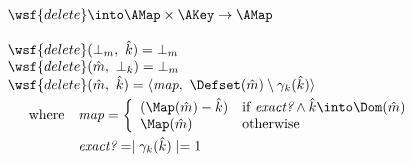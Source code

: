 $\begin{array}{l}
\wsf{delete} \into \AMap \times \AKey \rightarrow \AMap \\\\

\wsf{delete}(\bot_m,\ \hat{k}) = \bot_m \\
\wsf{delete}(\hat{m},\ \bot_k) = \bot_m \\

\wsf{delete}(\hat{m},\ \hat{k}) =
\langle \emph{map},\ \Defset(\hat{m}) \setminus \gamma_k(\hat{k}) \rangle \vspace{1mm}\\
\quad \begin{array}{rl} \textrm{where}
& \emph{map} = \left \{ \begin{array}{ll}
(\Map(\hat{m}) - \hat{k})
& \textrm{if } \emph{exact?} \land \hat{k} \into \Dom(\hat{m}) \\
\Map(\hat{m})
& \textrm{otherwise} \\
\end{array} \right. \vspace{1mm}\\

& \emph{exact?} = \mid \gamma_k(\hat{k}) \mid = 1 \\
\end{array} \\
\end{array}$


